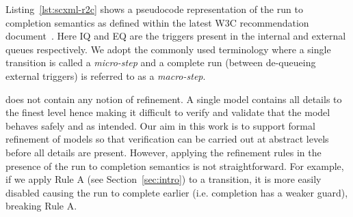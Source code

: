Listing~\ref{lst:scxml-r2c} shows a pseudocode representation of the run to completion semantics as defined within the latest W3C recommendation document~\cite{scxmlwebsite}. Here IQ and EQ are the triggers present in the internal and external queues respectively. We adopt the commonly used terminology where a single transition is called a \emph{micro-step} and a complete run (between de-queueing external triggers) is referred to as a \emph{macro-step}.

\SCXML does not contain any notion of refinement. 
A single model contains all details to the finest level hence making it difficult to verify and validate that the model behaves safely and as intended.
Our aim in this work is to support formal refinement of \SCXML models so that verification can be carried out at abstract levels before all details are present.
However, applying the refinement rules in the presence of the run to completion semantics is not straightforward.
For example, if we apply Rule A (see Section~\ref{sec:intro}) to a transition, it is more easily disabled causing the run to complete earlier (i.e. completion has a weaker guard), breaking Rule A.


